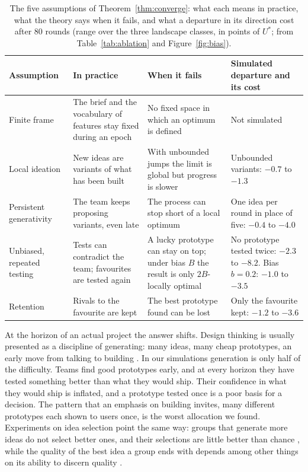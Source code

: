 \documentclass[10pt,twocolumn]{article}
\theoremstyle{definition}
\begin{document}
\begin{table}[t]
\caption{The five assumptions of Theorem~\ref{thm:converge}: what each means in practice, what the theory says when it fails, and what a departure in its direction cost after 80 rounds (range over the three landscape classes, in points of $U^*$; from Table~\ref{tab:ablation} and Figure~\ref{fig:bias}).}
\label{tab:conditions}
\centering\small
\begin{tabularx}{\textwidth}{@{}p{2.6cm}XXp{4.2cm}@{}}
\toprule
Assumption & In practice & When it fails & Simulated departure and its cost\\
\midrule
Finite frame & The brief and the vocabulary of features stay fixed during an epoch & No fixed space in which an optimum is defined & Not simulated\\
Local ideation & New ideas are variants of what has been built & With unbounded jumps the limit is global but progress is slower & Unbounded variants: $-0.7$ to $-1.3$\\
Persistent generativity & The team keeps proposing variants, even late & The process can stop short of a local optimum & One idea per round in place of five: $-0.4$ to $-4.0$\\
Unbiased, repeated testing & Tests can contradict the team; favourites are tested again & A lucky prototype can stay on top; under bias $B$ the result is only $2B$-locally optimal & No prototype tested twice: $-2.3$ to $-8.2$. Bias $b=0.2$: $-1.0$ to $-3.5$\\
Retention & Rivals to the favourite are kept & The best prototype found can be lost & Only the favourite kept: $-1.2$ to $-3.6$\\
\bottomrule
\end{tabularx}
\end{table}

At the horizon of an actual project the answer shifts. Design thinking is usually presented as a discipline of generating: many ideas, many cheap prototypes, an early move from talking to building \citep{brown2008, dschool2010}. In our simulations generation is only half of the difficulty. Teams find good prototypes early, and at every horizon they have tested something better than what they would ship. Their confidence in what they would ship is inflated, and a prototype tested once is a poor basis for a decision. The pattern that an emphasis on building invites, many different prototypes each shown to users once, is the worst allocation we found. Experiments on idea selection point the same way: groups that generate more ideas do not select better ones, and their selections are little better than chance \citep{rietzschel2006}, while the quality of the best idea a group ends with depends among other things on its ability to discern quality \citep{girotra2010}.
\end{document}
